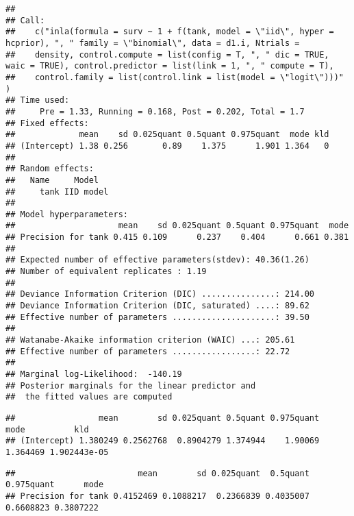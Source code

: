 \documentclass[
]{article}
\newenvironment{Shaded}{\begin{snugshade}}{\end{snugshade}}
\newcommand{\FloatTok}[1]{\textcolor[rgb]{0.00,0.00,0.81}{#1}}
\newcommand{\NormalTok}[1]{#1}
\newcommand{\OperatorTok}[1]{\textcolor[rgb]{0.81,0.36,0.00}{\textbf{#1}}}
\begin{document}
\begin{verbatim}
## 
## Call:
##    c("inla(formula = surv ~ 1 + f(tank, model = \"iid\", hyper = hcprior), ", " family = \"binomial\", data = d1.i, Ntrials = 
##    density, control.compute = list(config = T, ", " dic = TRUE, waic = TRUE), control.predictor = list(link = 1, ", " compute = T), 
##    control.family = list(control.link = list(model = \"logit\")))" ) 
## Time used:
##     Pre = 1.33, Running = 0.168, Post = 0.202, Total = 1.7 
## Fixed effects:
##             mean    sd 0.025quant 0.5quant 0.975quant  mode kld
## (Intercept) 1.38 0.256       0.89    1.375      1.901 1.364   0
## 
## Random effects:
##   Name     Model
##     tank IID model
## 
## Model hyperparameters:
##                     mean    sd 0.025quant 0.5quant 0.975quant  mode
## Precision for tank 0.415 0.109      0.237    0.404      0.661 0.381
## 
## Expected number of effective parameters(stdev): 40.36(1.26)
## Number of equivalent replicates : 1.19 
## 
## Deviance Information Criterion (DIC) ...............: 214.00
## Deviance Information Criterion (DIC, saturated) ....: 89.62
## Effective number of parameters .....................: 39.50
## 
## Watanabe-Akaike information criterion (WAIC) ...: 205.61
## Effective number of parameters .................: 22.72
## 
## Marginal log-Likelihood:  -140.19 
## Posterior marginals for the linear predictor and
##  the fitted values are computed
\end{verbatim}

\begin{Shaded}
\end{Shaded}

\begin{verbatim}
##                 mean        sd 0.025quant 0.5quant 0.975quant     mode          kld
## (Intercept) 1.380249 0.2562768  0.8904279 1.374944    1.90069 1.364469 1.902443e-05
\end{verbatim}

\begin{Shaded}
\end{Shaded}

\begin{verbatim}
##                         mean        sd 0.025quant  0.5quant 0.975quant      mode
## Precision for tank 0.4152469 0.1088217  0.2366839 0.4035007  0.6608823 0.3807222
\end{verbatim}
\end{document}
